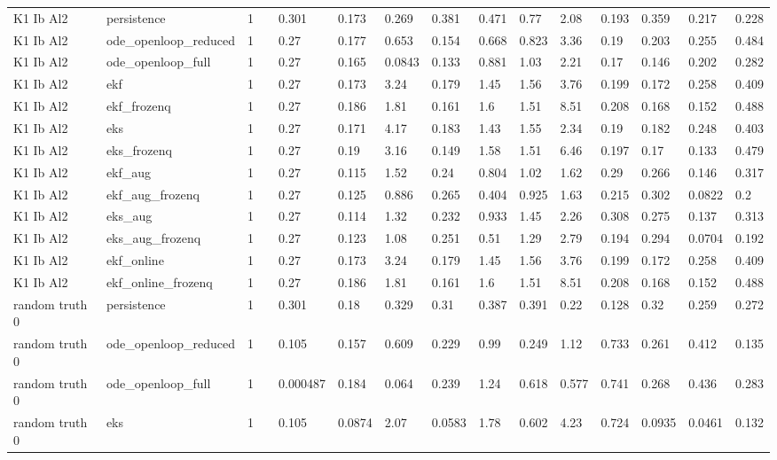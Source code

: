 \begin{table}[t]
\begin{tabular}{lllllllllllllll}
K1 Ib Al2 & persistence & 1 &  & 0.301 & 0.173 & 0.269 & 0.381 & 0.471 & 0.77 & 2.08 & 0.193 & 0.359 & 0.217 & 0.228 \\
K1 Ib Al2 & ode\_openloop\_reduced & 1 &  & 0.27 & 0.177 & 0.653 & 0.154 & 0.668 & 0.823 & 3.36 & 0.19 & 0.203 & 0.255 & 0.484 \\
K1 Ib Al2 & ode\_openloop\_full & 1 &  & 0.27 & 0.165 & 0.0843 & 0.133 & 0.881 & 1.03 & 2.21 & 0.17 & 0.146 & 0.202 & 0.282 \\
K1 Ib Al2 & ekf & 1 &  & 0.27 & 0.173 & 3.24 & 0.179 & 1.45 & 1.56 & 3.76 & 0.199 & 0.172 & 0.258 & 0.409 \\
K1 Ib Al2 & ekf\_frozenq & 1 &  & 0.27 & 0.186 & 1.81 & 0.161 & 1.6 & 1.51 & 8.51 & 0.208 & 0.168 & 0.152 & 0.488 \\
K1 Ib Al2 & eks & 1 &  & 0.27 & 0.171 & 4.17 & 0.183 & 1.43 & 1.55 & 2.34 & 0.19 & 0.182 & 0.248 & 0.403 \\
K1 Ib Al2 & eks\_frozenq & 1 &  & 0.27 & 0.19 & 3.16 & 0.149 & 1.58 & 1.51 & 6.46 & 0.197 & 0.17 & 0.133 & 0.479 \\
K1 Ib Al2 & ekf\_aug & 1 &  & 0.27 & 0.115 & 1.52 & 0.24 & 0.804 & 1.02 & 1.62 & 0.29 & 0.266 & 0.146 & 0.317 \\
K1 Ib Al2 & ekf\_aug\_frozenq & 1 &  & 0.27 & 0.125 & 0.886 & 0.265 & 0.404 & 0.925 & 1.63 & 0.215 & 0.302 & 0.0822 & 0.2 \\
K1 Ib Al2 & eks\_aug & 1 &  & 0.27 & 0.114 & 1.32 & 0.232 & 0.933 & 1.45 & 2.26 & 0.308 & 0.275 & 0.137 & 0.313 \\
K1 Ib Al2 & eks\_aug\_frozenq & 1 &  & 0.27 & 0.123 & 1.08 & 0.251 & 0.51 & 1.29 & 2.79 & 0.194 & 0.294 & 0.0704 & 0.192 \\
K1 Ib Al2 & ekf\_online & 1 &  & 0.27 & 0.173 & 3.24 & 0.179 & 1.45 & 1.56 & 3.76 & 0.199 & 0.172 & 0.258 & 0.409 \\
K1 Ib Al2 & ekf\_online\_frozenq & 1 &  & 0.27 & 0.186 & 1.81 & 0.161 & 1.6 & 1.51 & 8.51 & 0.208 & 0.168 & 0.152 & 0.488 \\
random truth 0 & persistence & 1 &  & 0.301 & 0.18 & 0.329 & 0.31 & 0.387 & 0.391 & 0.22 & 0.128 & 0.32 & 0.259 & 0.272 \\
random truth 0 & ode\_openloop\_reduced & 1 &  & 0.105 & 0.157 & 0.609 & 0.229 & 0.99 & 0.249 & 1.12 & 0.733 & 0.261 & 0.412 & 0.135 \\
random truth 0 & ode\_openloop\_full & 1 &  & 0.000487 & 0.184 & 0.064 & 0.239 & 1.24 & 0.618 & 0.577 & 0.741 & 0.268 & 0.436 & 0.283 \\
random truth 0 & eks & 1 &  & 0.105 & 0.0874 & 2.07 & 0.0583 & 1.78 & 0.602 & 4.23 & 0.724 & 0.0935 & 0.0461 & 0.132 \\

\end{tabular}
\end{table}
